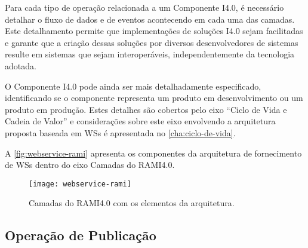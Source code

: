 Para cada tipo de operação relacionada a um Componente I4.0, é necessário detalhar o fluxo de dados e de eventos acontecendo em cada uma das camadas. Este detalhamento permite que implementações de soluções I4.0 sejam facilitadas e garante que a criação dessas soluções por diversos desenvolvedores de sistemas resulte em sistemas que sejam interoperáveis, independentemente da tecnologia adotada.

O Componente I4.0 pode ainda ser mais detalhadamente especificado, identificando se o componente representa um produto em desenvolvimento ou um produto em produção. Estes detalhes são cobertos pelo eixo ``Ciclo de Vida e Cadeia de Valor'' e considerações sobre este eixo envolvendo a arquitetura proposta baseada em WSs é apresentada no \autoref{cha:ciclo-de-vida}.

A \autoref{fig:webservice-rami} apresenta os componentes da arquitetura de fornecimento de WSs dentro do eixo Camadas do RAMI4.0.%


\begin{figure}[H]
	\centering
	\texttt{[image: webservice-rami]}
	\caption{Camadas do RAMI4.0 com os elementos da arquitetura.}
	\label{fig:webservice-rami}
\end{figure}

\subsection{Operação de Publicação}

